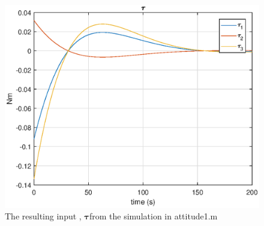\begin{figure}[htb!]
	\centering
	\includegraphics[width=1.00\textwidth]{figures/1_tau_track.eps}
	\caption{The resulting input , $\boldsymbol{\tau}$from the simulation in attitude1.m}
\label{fig:sim_attitude1_tau}
\end{figure}







